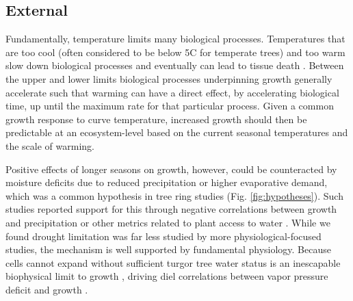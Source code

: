 \documentclass[11pt]{article}
\begin{document}
\subsection*{External}

Fundamentally, temperature limits many biological processes. Temperatures that are too cool (often considered to be below 5\degree C for temperate trees) and too warm \citep[an area of active research,][]{martinez2008hot,cabon2022cross} slow down biological processes and eventually can lead to tissue death \citep[see Fig. \ref{fig:temperaturecomplex}][]{larcher1980,kramer2012book}. Between the upper and lower limits biological processes underpinning growth generally accelerate such that warming can have a direct effect,  by accelerating biological time, up until the maximum rate for that particular process. Given a common growth response to curve temperature, increased growth should then be predictable at an ecosystem-level based on the current seasonal temperatures and the scale of warming. 

Positive effects of longer seasons on growth, however, could be counteracted by moisture deficits due to reduced precipitation or higher evaporative demand, which was a common hypothesis in tree ring studies (Fig. \ref{fig:hypotheses}). Such studies reported support for this through negative correlations between growth and precipitation or other metrics related to plant access to water \citep{george2014overview,babst2019twentieth}. While we found drought limitation was far less studied by more physiological-focused studies, the mechanism is well supported by fundamental physiology. Because cells cannot expand without sufficient turgor \citep{cosgrove1987wall,cosgrove2023structure} tree water status is an inescapable biophysical limit to growth \citep{peters2021turgor}, driving diel correlations between vapor pressure deficit and growth \citep{babst2019twentieth,zweifel2021trees}.
\end{document}
